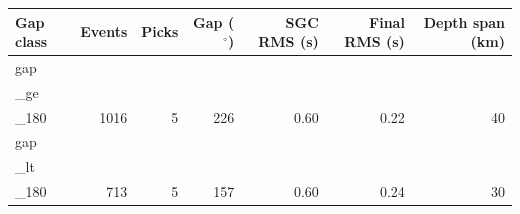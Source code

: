 \begin{tabular}{lrrrrrr}
\hline
Gap class & Events & Picks & Gap ($^\circ$) & SGC RMS (s) & Final RMS (s) & Depth span (km) \\
\hline
gap\\_ge\\_180 & 1016 & 5 & 226 & 0.60 & 0.22 & 40 \\
gap\\_lt\\_180 & 713 & 5 & 157 & 0.60 & 0.24 & 30 \\
\hline
\end{tabular}